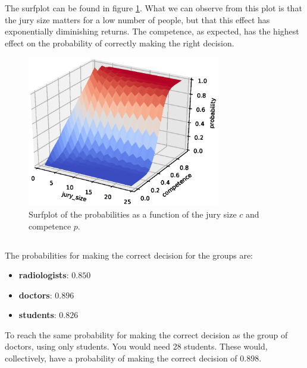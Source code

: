 \documentclass[11pt]{article}
\begin{document}
The surfplot can be found in figure \ref{fig:surf_probs}. What we can observe from this plot is that the jury size matters for a low number of people, but that this effect has exponentially diminishing returns. The competence, as expected, has the highest effect on the probability of correctly making the right decision.

\begin{figure}[H]
	\centering
	\includegraphics[width=0.75\textwidth]{images/surfplot_probs.eps}
	\caption{Surfplot of the probabilities as a function of the jury size $c$ and competence $p$.}
	\label{fig:surf_probs}
\end{figure}

\subsection{}
The probabilities for making the correct decision for the groups are:
\begin{itemize}
	\item \textbf{radiologists}: $0.850$
	\item \textbf{doctors}: $0.896$
	\item \textbf{students}: $0.826$
\end{itemize}
To reach the same probability for making the correct decision as the group of doctors, using only students. You would need 28 students. These would, collectively, have a probability of making the correct decision of $0.898$.
\end{document}
